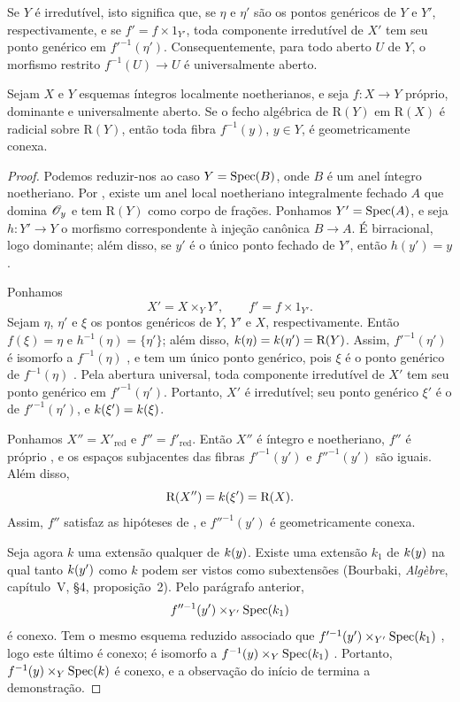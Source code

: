 Se $Y$ é irredutível, isto significa que, se $\eta$ e $\eta'$ são
os pontos genéricos de $Y$ e $Y'$, respectivamente, e se
$f'=f\times 1_{Y'}$, toda componente irredutível de $X'$ tem seu
ponto genérico em $f'^{-1}(\eta')$. Consequentemente, para todo
aberto $U$ de $Y$, o morfismo restrito $f^{-1}(U)\to U$ é
universalmente aberto.

\begin{corollary}[4.3.10]
\label{III.4.3.10}
Sejam $X$ e $Y$ esquemas íntegros localmente noetherianos, e seja
$f:X\to Y$ próprio, dominante e universalmente aberto. Se o fecho
algébrica de $\mathrm{R}(Y)$ em $\mathrm{R}(X)$ é radicial sobre
$\mathrm{R}(Y)$, então toda fibra $f^{-1}(y)$, $y\in Y$, é
geometricamente conexa.
\end{corollary}

\begin{proof}
Podemos reduzir-nos ao caso $Y=\operatorname{Spec}(B)$, onde $B$ é um anel
íntegro noetheriano. Por , existe um anel local
noetheriano integralmente fechado $A$ que domina $\mathscr{O}_y$ e tem
$\mathrm{R}(Y)$ como corpo de frações. Ponhamos $Y'=\operatorname{Spec}(A)$, e
seja $h:Y'\to Y$ o morfismo correspondente à injeção canônica
$B\to A$. É birracional, logo dominante; além disso, se $y'$ é o
único ponto fechado de $Y'$, então $h(y')=y$.

Ponhamos
\[
  X'=X\times_Y Y',
  \qquad
  f'=f\times 1_{Y'}.
\]
Sejam $\eta$, $\eta'$ e $\xi$ os pontos genéricos de $Y$, $Y'$ e
$X$, respectivamente. Então $f(\xi)=\eta$ e
$h^{-1}(\eta)=\{\eta'\}$; além disso,
$k(\eta)=k(\eta')=\mathrm{R}(Y)$. Assim, $f'^{-1}(\eta')$ é
isomorfo a $f^{-1}(\eta)$ , e tem um único ponto
genérico, pois $\xi$ é o ponto genérico de
$f^{-1}(\eta)$ . Pela abertura universal, toda
componente irredutível de $X'$ tem seu ponto genérico em
$f'^{-1}(\eta')$. Portanto, $X'$ é irredutível; seu ponto genérico
$\xi'$ é o de $f'^{-1}(\eta')$, e
$k(\xi')=k(\xi)$.


Ponhamos $X''=X'_{\mathrm{red}}$ e $f''=f'_{\mathrm{red}}$. Então
$X''$ é íntegro e noetheriano, $f''$ é próprio
, e os espaços subjacentes das fibras
$f'^{-1}(y')$ e $f''^{-1}(y')$ são iguais. Além disso,
\[
  \mathrm{R}(X'')=k(\xi')=\mathrm{R}(X).
\]
Assim, $f''$ satisfaz as hipóteses de , e
$f''^{-1}(y')$ é geometricamente conexa.

Seja agora $k$ uma extensão qualquer de $k(y)$. Existe uma
extensão $k_1$ de $k(y)$ na qual tanto $k(y')$ como $k$
podem ser vistos como subextensões (Bourbaki, \emph{Alg\`ebre},
capítulo~V, \S4, proposição~2). Pelo parágrafo anterior,
\[
  f''^{-1}(y')\times_{Y'}\operatorname{Spec}(k_1)
\]
é conexo. Tem o mesmo esquema reduzido associado que
$f'^{-1}(y')\times_{Y'}\operatorname{Spec}(k_1)$
, logo este último é conexo; é isomorfo a
$f^{-1}(y)\times_Y\operatorname{Spec}(k_1)$ . Portanto,
$f^{-1}(y)\times_Y\operatorname{Spec}(k)$ é conexo, e a observação do início
de  termina a demonstração.
\end{proof}

